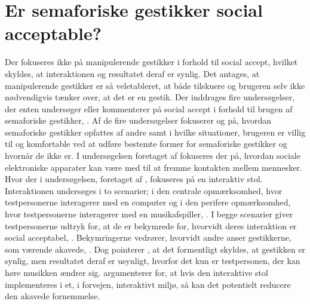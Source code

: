 \section{Er semaforiske gestikker social acceptable?}
\label{Socialaccept}
%            
Der fokuseres ikke på manipulerende gestikker i forhold til social accept, hvilket skyldes, at interaktionen og resultatet deraf er synlig. Det antages, at manipulerende gestikker er så veletableret, at både tilskuere og brugeren selv ikke nødvendigvis tænker over, at det er en gestik. \blankline
%
Der inddrages fire undersøgelser, der enten undersøger eller kommenterer på social accept i forhold til brugen af semaforiske gestikker, \parencite{PDF:AChairAsUbiquitousInputDevice, PDF:WouldYouDoThat, PDF:AreYouComfortableDoingThat, PDF:AnExploratoryStudy}. Af de fire undersøgelser fokuserer \textcite{PDF:AreYouComfortableDoingThat} og \textcite{PDF:WouldYouDoThat} på, hvordan semaforiske gestikker opfattes af andre samt i hvilke situationer, brugeren er villig til og komfortable ved at udføre bestemte former for semaforiske gestikker og hvornår de ikke er. I undersøgelsen foretaget af \textcite{PDF:AnExploratoryStudy} fokuseres der på, hvordan sociale elektroniske apparater kan være med til at fremme kontakten mellem mennesker. Hvor der i undersøgelsen, foretaget af \textcite{PDF:AChairAsUbiquitousInputDevice}, fokuseres på en interaktiv stol. Interaktionen undersøges i to scenarier; i den centrale opmærksomhed, hvor testpersonerne interagerer med en computer og i den perifere opmærksomhed, hvor testpersonerne interagerer med en musikafspiller, \parencite{PDF:AChairAsUbiquitousInputDevice}. I begge scenarier giver testpersonerne udtryk for, at de er bekymrede for, hvorvidt deres interaktion er social acceptabel, \parencite[s. 8]{PDF:AChairAsUbiquitousInputDevice}. Bekymringerne vedrører, hvorvidt andre anser gestikkerne, som værende akavede, \parencite[s. 4]{PDF:AChairAsUbiquitousInputDevice}. Dog pointerer \textcite[s. 9]{PDF:AChairAsUbiquitousInputDevice}, at det formentligt skyldes, at gestikken er synlig, men resultatet deraf er usynligt, hvorfor det kun er testpersonen, der kan høre musikken ændrer sig. \textcite[s. 9]{PDF:AChairAsUbiquitousInputDevice} argumenterer for, at hvis den interaktive stol implementeres i et, i forvejen, interaktivt miljø, så kan det potentielt reducere den akavede fornemmelse.\blankline
%
